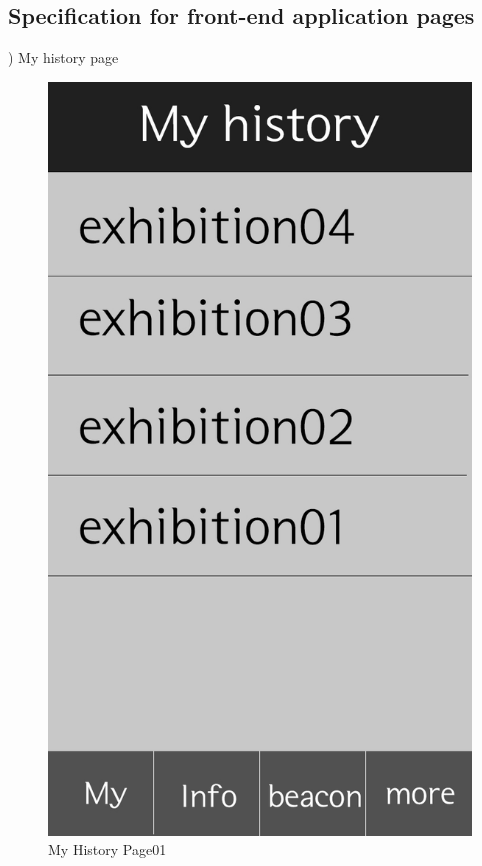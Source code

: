 \documentclass[conference]{IEEEtran}
\begin{document}
\subsection{Specification for front-end application pages}
) My history page\\

\begin{figure}[htbp]
\begin{center}
    \includegraphics[scale=0.15]{img_MyHistory}
    \caption{My History Page01} 
\end{center}
\end{figure}
\end{document}
